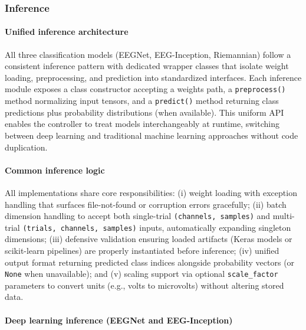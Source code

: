 \documentclass[12pt]{report}
\begin{document}
\subsubsection{Inference}

\paragraph{Unified inference architecture}\mbox{}

All three classification models (EEGNet, EEG-Inception, Riemannian) follow a consistent inference pattern with dedicated wrapper classes that isolate weight loading, preprocessing, and prediction into standardized interfaces. Each inference module exposes a class constructor accepting a weights path, a \texttt{preprocess()} method normalizing input tensors, and a \texttt{predict()} method returning class predictions plus probability distributions (when available). This uniform API enables the controller to treat models interchangeably at runtime, switching between deep learning and traditional machine learning approaches without code duplication.

\paragraph{Common inference logic}\mbox{}

All implementations share core responsibilities: (i) weight loading with exception handling that surfaces file-not-found or corruption errors gracefully; (ii) batch dimension handling to accept both single-trial \texttt{(channels, samples)} and multi-trial \texttt{(trials, channels, samples)} inputs, automatically expanding singleton dimensions; (iii) defensive validation ensuring loaded artifacts (Keras models or scikit-learn pipelines) are properly instantiated before inference; (iv) unified output format returning predicted class indices alongside probability vectors (or \texttt{None} when unavailable); and (v) scaling support via optional \texttt{scale\_factor} parameters to convert units (e.g., volts to microvolts) without altering stored data.

\paragraph{Deep learning inference (EEGNet and EEG-Inception)}\mbox{}
\end{document}
